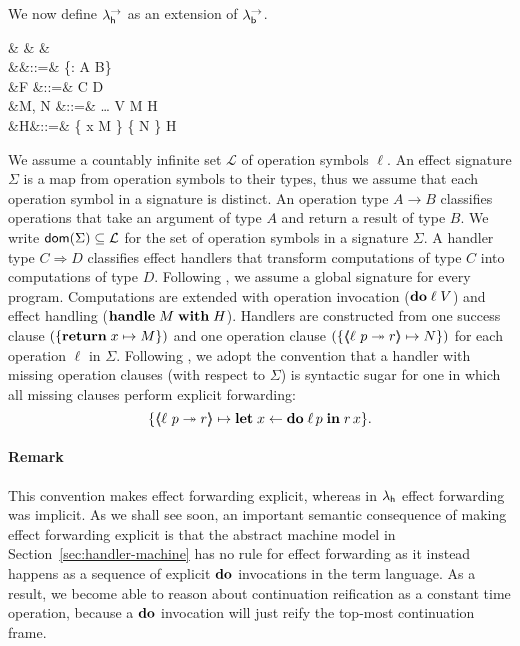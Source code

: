 \documentclass[12pt,phd,lfcs,twoside,openright,logo,leftchapter,normalheadings]{infthesis}
\theoremstyle{plain}
\theoremstyle{definition}
\begin{document}
We now define $\lambda^\rightarrow_{\mathsf{h}}$ as an extension of $\lambda^\rightarrow_{\mathsf{b}}$.
%
{
\begin{syntax}
 &\ell \in {} & & \\
        &\Sigma&::=& \cdot \mid \{\ell : A \to B\} \cup \Sigma\\
     &F     &::=& C \Rightarrow D\\
 &M, N &::=& \dots \mid \Do \; \ell \; V
                          \mid  \Handle \; M \; \With \; H \\
     &H&::=& \{ \Return \; x \mapsto M \}
                      \mid  \{  \mapsto N \} \uplus H\\
\end{syntax}}%
%
We assume a countably infinite set $\mathcal{L}$ of operation symbols
$\ell$.
%
An effect signature $\Sigma$ is a map from operation symbols to their
types, thus we assume that each operation symbol in a signature is
distinct. An operation type $A \to B$ classifies operations that take
an argument of type $A$ and return a result of type $B$.
%
We write $\mathsf{dom}(\Sigma) \subseteq \mathcal{L}$ for the set of operation
symbols in a signature $\Sigma$.
%
A handler type $C \Rightarrow D$ classifies effect handlers that
transform computations of type $C$ into computations of type $D$.
%
Following \citet{Pretnar15}, we assume a global signature for every
program.
%
Computations are extended with operation invocation ($\mathbf{do}\;\ell\;V$)
and effect handling ($\mathbf{handle}\; M \;\mathbf{with}\; H$).
%
Handlers are constructed from one success clause $(\{\mathbf{return}\; x \mapsto
M\})$ and one operation clause $(\{ \langle\!\!\langle \ell~p \twoheadrightarrow r \rangle\!\!\rangle \mapsto N \})$ for
each operation $\ell$ in $\Sigma$.
%
Following \citet{PlotkinP13}, we adopt the convention that a handler
with missing operation clauses (with respect to $\Sigma$) is syntactic
sugar for one in which all missing clauses perform explicit
forwarding:
%
\[
   \{\langle\!\!\langle \ell~p \twoheadrightarrow r \rangle\!\!\rangle \mapsto \mathbf{let}\; x \leftarrow \mathbf{do} \; \ell \, p \;\mathbf{in}\; r \, x\}.
\]
%
\paragraph{Remark}
  This convention makes effect forwarding explicit, whereas in
  $\lambda_{\mathsf{h}}$ effect forwarding was implicit. As we shall see soon, an
  important semantic consequence of making effect forwarding explicit
  is that the abstract machine model in
  Section~\ref{sec:handler-machine} has no rule for effect forwarding
  as it instead happens as a sequence of explicit $\mathbf{do}$ invocations in
  the term language. As a result, we become able to reason about
  continuation reification as a constant time operation, because a
  $\mathbf{do}$ invocation will just reify the top-most continuation frame.\medskip
\end{document}
